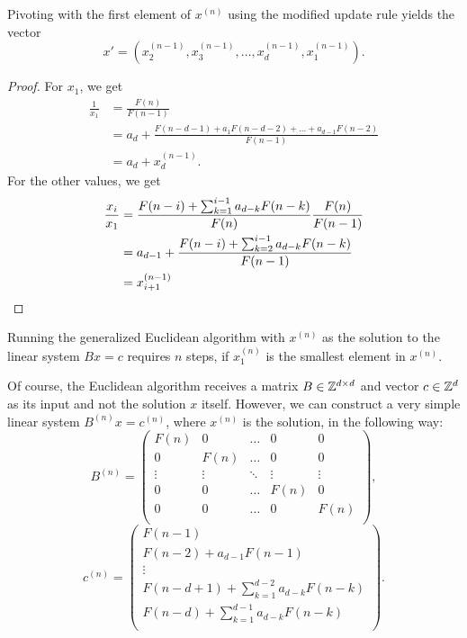 \begin{lemma}
  Pivoting with the first element of $x^{(n)}$ using the modified update rule yields the vector
  \[
    x' = (x^{(n-1)}_2, x^{(n-1)}_3, \dots, x^{(n-1)}_d, x^{(n-1)}_1).
  \]
\end{lemma}

\begin{proof}
  For $x_1$, we get
  \[
    \begin{aligned}
      \frac{1}{x_1}
      & = \frac{F(n)}{F(n - 1)} \\
      & = a_d + \frac{F(n - d - 1) + a_1 F(n - d - 2) + \dots + a_{d-1} F(n - 2)}{F(n - 1)} \\
      & = a_d + x^{(n-1)}_d.
    \end{aligned}
  \]
  For the other values, we get
  \begin{align*}
    \frac{x_i}{x_1}
    & = \frac{F(n - i) + \sum_{k=1}^{i-1} a_{d-k} F(n - k)}{F(n)} \frac{F(n)}{F(n - 1)} \\
    & = a_{d-1} + \frac{F(n - i) + \sum_{k=2}^{i-1} a_{d-k} F(n - k)}{F(n-1)} \\
    & = x^{(n-1)}_{i+1} \qedhere
  \end{align*}
\end{proof}

\begin{corollary}
  Running the generalized Euclidean algorithm with $x^{(n)}$ as the solution to
  the linear system $B x = c$ requires $n$ steps, if $x^{(n)}_1$ is the
  smallest element in $x^{(n)}$.
\end{corollary}

Of course, the Euclidean algorithm receives a matrix $B \in {\mathbb Z}^{d \times d}$
and vector $c \in {\mathbb Z}^d$ as its input and not the solution $x$ itself.
However, we can construct a very simple linear system $B^{(n)} x = c^{(n)}$,
where $x^{(n)}$ is the solution, in the following way:
\[
  B^{(n)} =
  \begin{pmatrix}
    F(n) & 0 & \dots & 0 & 0 \\
    0 & F(n) & \dots & 0 & 0 \\
    \vdots & \vdots & \ddots & \vdots & \vdots \\
    0 & 0 & \dots & F(n) & 0 \\
    0 & 0 & \dots & 0 & F(n) \\
  \end{pmatrix},
\]
\[
  c^{(n)} =
  \begin{pmatrix}
    F(n - 1) \\
    F(n - 2) + a_{d-1} F(n - 1) \\
    \vdots \\
    F(n - d + 1) + \sum_{k=1}^{d-2} a_{d-k} F(n - k) \\
    F(n - d) + \sum_{k=1}^{d-1} a_{d-k} F(n - k) \\
  \end{pmatrix}.
\]

